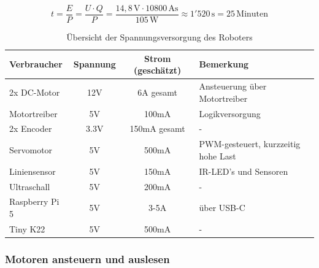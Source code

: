 \begin{equation}
    t = \frac{E}{P} = \frac{U \cdot Q}{P} = \frac{14{,}8\,\text{V} \cdot 10800\,\text{As}}{105\,\text{W}} \approx 1{'}520\,\text{s} = 25\,\text{Minuten} 
    \label{eq:Energieverbrauch}
\end{equation}



\newpage

\begin{table}[h!]
\centering
\renewcommand{\arraystretch}{1.3}
\begin{tabular}{@{} l c c l @{}}
\toprule
\textbf{Verbraucher}         & \textbf{Spannung} & \textbf{Strom (geschätzt)} & \textbf{Bemerkung} \\
\midrule
2x DC-Motor                  & 12V              & 6A gesamt               & Ansteuerung über Motortreiber \\

Motortreiber & 5V               &  100mA              & Logikversorgung \\

2x Encoder & 3.3V               &  150mA gesamt             &- \\

Servomotor                   & 5V               &  500mA                 & PWM-gesteuert, kurzzeitig hohe Last \\

Liniensensor         & 5V               &  150mA                  & IR-LED's und Sensoren \\

Ultraschall & 5V               &  200mA              &- \\

Raspberry Pi 5              & 5V               & 3-5A                      & über USB-C \\

Tiny K22             & 5V               & 500mA                      & - \\

\bottomrule
\end{tabular}
\caption{Übersicht der Spannungsversorgung des Roboters}
\label{tab:spannungsversorgung}
\end{table}



\subsubsection{Motoren ansteuern und auslesen}
\label{motoren-encoder}



